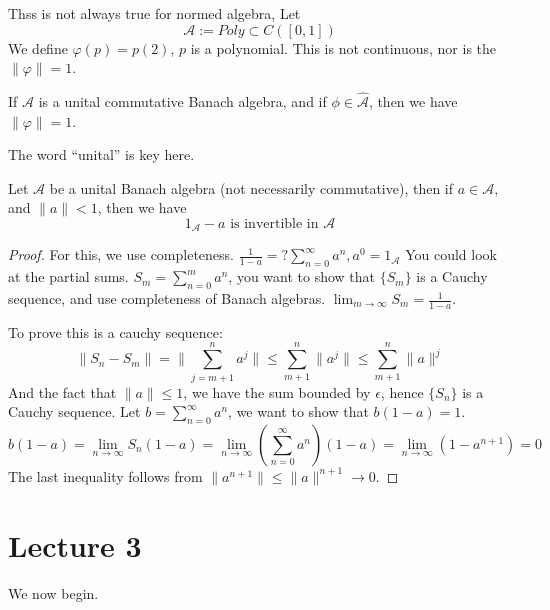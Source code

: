 Thss is not always true for normed algebra,
Let
\begin{equation*}
    \mathcal{A}:= Poly\subset C([0,1])
\end{equation*}
We define $\varphi(p)=p(2)$, $p$ is a polynomial. This is not continuous, nor is the $\|\varphi\|=1$.


\begin{proposition}
    If $\mathcal{A}$ is a unital commutative Banach algebra, and if $\phi\in\widehat{\mathcal{A}}$, then we have $\|\varphi\|=1$.
\end{proposition}

The word ``unital'' is key here.

\begin{proposition}
    Let $\mathcal{A}$ be a unital Banach algebra (not necessarily commutative), then if $a\in\mathcal{A}$, and $\|a\|< 1$, then we have
    \begin{equation*}
        1_\mathcal{A}-a \text{ is invertible in } \mathcal{A}
    \end{equation*}
\end{proposition}
\begin{proof}
    For this, we use completeness.
    $\frac{1}{1-a}=?\sum_{n=0}^\infty a^n, a^0=1_\mathcal{A}$
    You could look at the partial sums. $S_m=\sum_{n=0}^ma^n$, you want to show that $\{S_m\}$ is a Cauchy sequence, and use completeness of Banach algebras. $\lim_{m\to\infty}S_m=\frac{1}{1-a}$.
    
    To prove this is a cauchy sequence:
    \begin{equation*}
        \|S_n-S_m\|=\|\sum_{j=m+1}^na^j\|\leq\sum_{m+1}^n\|a^j\|\leq\sum_{m+1}^n\|a\|^j
    \end{equation*}
    And the fact that $\|a\|\leq 1$, we have the sum bounded by $\epsilon$, hence $\{S_n\}$ is a Cauchy sequence. Let $b=\sum_{n=0}^\infty a^n$, we want to show that $b(1-a)=1$.
    \begin{equation*}
        b(1-a)=\lim_{n\to\infty}{S_n}(1-a)=\lim_{n\to\infty}\left(\sum_{n=0}^\infty a^n\right)(1-a)=\lim_{n\to\infty}(1-a^{n+1})=0
    \end{equation*}
    The last inequality follows from $\|a^{n+1}\|\leq\|a\|^{n+1}\to 0$.
\end{proof}


\section{Lecture 3}
We now begin.

